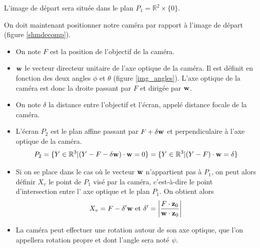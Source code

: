 L'image de départ sera située dans le plan $P_{1}= \mathbb{R}^{2}\times \{0\}$.

On doit maintenant positionner notre caméra par rapport à l'image de départ (figure \ref{shmdecomp}).

\begin{Not}
\begin{itemize}
\item On note $F$ est la position de l'objectif de la caméra.

\item $\mathbf{w}$ le vecteur directeur unitaire de l'axe optique de la caméra. Il est définit en fonction des deux angles $\phi$ et $\theta$ (figure \ref{img_angles}). L'axe optique de la caméra est donc la droite passant par $F$ et dirigée par $\mathbf{w}$.

\item On note $\delta$ la distance entre l'objectif et l'écran, appelé distance focale de la caméra.

\item L'écran $P_{2}$ est le plan affine passant par $F+\delta \mathbf{w}$ et perpendiculaire à l'axe optique de la caméra.
\begin{equation*}
P_{2}=\{Y\in \mathbb{R}^{3}|(Y-F-\delta \mathbf{w})\cdot \mathbf{w}=0\}=\{Y\in \mathbb{R}^{3}|(Y-F)\cdot \mathbf{w}=\delta\}
\end{equation*}

\item Si on se place dans le cas où le vecteur $\mathbf{w}$ n'appartient pas à $P_{1}$, on peut alors définir $X_{v}$ le point de $P_{1}$ visé par la caméra, c'est-à-dire le point d'intersection entre l' axe optique et le plan $P_{1}$. On obtient alors
\begin{equation*}
X_{v}=F-\delta'\mathbf{w} \text{ et }\delta'=\small{\left|\frac{F \cdot \mathbf{z}_{0}}{\mathbf{w}\cdot \mathbf{z}_{0}} \right|}
\end{equation*}

\item La caméra peut  effectuer une rotation autour de son axe optique, que l'on appellera rotation propre et dont l'angle sera noté $\psi$.
\end{itemize}
\label{defpoint}
\end{Not}

